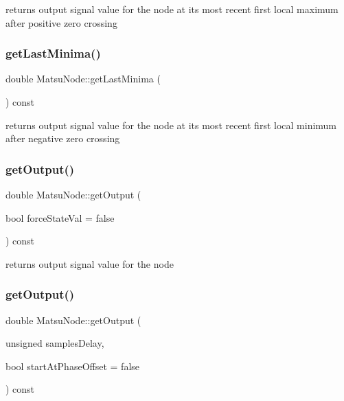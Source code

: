returns output signal value for the node at its most recent first local maximum after positive zero crossing 

\mbox{\label{classMatsuNode_acfa77ceec7938b33cada86bdf552d259}} 
\subsubsection{\texorpdfstring{get\+Last\+Minima()}{getLastMinima()}}
{\footnotesize\ttfamily double Matsu\+Node\+::get\+Last\+Minima (\begin{DoxyParamCaption}{ }\end{DoxyParamCaption}) const}



returns output signal value for the node at its most recent first local minimum after negative zero crossing 

\mbox{\label{classMatsuNode_a7907676afb6f8d695c904ac1f8fc5798}} 
\subsubsection{\texorpdfstring{get\+Output()}{getOutput()}\hspace{0.1cm}{\footnotesize\ttfamily [1/2]}}
{\footnotesize\ttfamily double Matsu\+Node\+::get\+Output (\begin{DoxyParamCaption}\item[{bool}]{force\+State\+Val = {\ttfamily false} }\end{DoxyParamCaption}) const}



returns output signal value for the node 

\mbox{\label{classMatsuNode_a049009ddb42ae27edf7e3e41a70799c7}} 
\subsubsection{\texorpdfstring{get\+Output()}{getOutput()}\hspace{0.1cm}{\footnotesize\ttfamily [2/2]}}
{\footnotesize\ttfamily double Matsu\+Node\+::get\+Output (\begin{DoxyParamCaption}\item[{unsigned}]{samples\+Delay,  }\item[{bool}]{start\+At\+Phase\+Offset = {\ttfamily false} }\end{DoxyParamCaption}) const}



